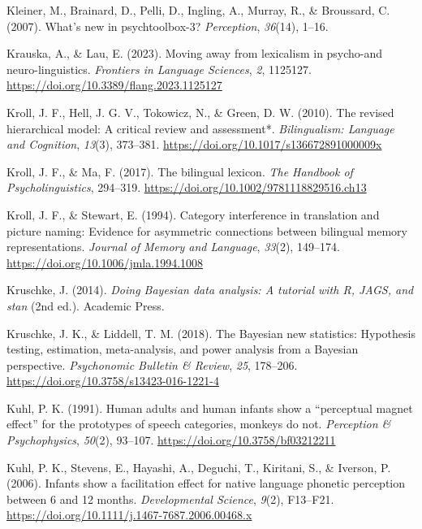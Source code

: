 \documentclass[
  12pt,
  b5paperpaper,
  twoside]{scrreprt}
\newlength{\cslhangindent}
\newlength{\cslentryspacingunit} %
\newenvironment{CSLReferences}[2] %
 {%
  \setlength{\parindent}{0pt}
  \ifodd #1
  \let\oldpar\par
  \def\par{\hangindent=\cslhangindent\oldpar}
  \fi
  \setlength{\parskip}{#2\cslentryspacingunit}
 }%
 {}
\begin{document}
\begin{CSLReferences}{1}{0}
\leavevmode{}%
Kleiner, M., Brainard, D., Pelli, D., Ingling, A., Murray, R., \&
Broussard, C. (2007). What's new in psychtoolbox-3? \emph{Perception},
\emph{36}(14), 1--16.

\leavevmode{}%
Krauska, A., \& Lau, E. (2023). Moving away from lexicalism in
psycho-and neuro-linguistics. \emph{Frontiers in Language Sciences},
\emph{2}, 1125127. \url{https://doi.org/10.3389/flang.2023.1125127}

\leavevmode{}%
Kroll, J. F., Hell, J. G. V., Tokowicz, N., \& Green, D. W. (2010). The
revised hierarchical model: A critical review and assessment*.
\emph{Bilingualism: Language and Cognition}, \emph{13}(3), 373--381.
\url{https://doi.org/10.1017/s136672891000009x}

\leavevmode{}%
Kroll, J. F., \& Ma, F. (2017). The bilingual lexicon. \emph{The
Handbook of Psycholinguistics}, 294--319.
\url{https://doi.org/10.1002/9781118829516.ch13}

\leavevmode{}%
Kroll, J. F., \& Stewart, E. (1994). Category interference in
translation and picture naming: Evidence for asymmetric connections
between bilingual memory representations. \emph{Journal of Memory and
Language}, \emph{33}(2), 149--174.
\url{https://doi.org/10.1006/jmla.1994.1008}

\leavevmode{}%
Kruschke, J. (2014). \emph{Doing {Bayesian} data analysis: A tutorial
with {R}, {JAGS}, and stan} (2nd ed.). {Academic Press}.

\leavevmode{}%
Kruschke, J. K., \& Liddell, T. M. (2018). The {Bayesian} new
statistics: Hypothesis testing, estimation, meta-analysis, and power
analysis from a {Bayesian} perspective. \emph{Psychonomic Bulletin \&
Review}, \emph{25}, 178--206.
\url{https://doi.org/10.3758/s13423-016-1221-4}

\leavevmode{}%
Kuhl, P. K. (1991). Human adults and human infants show a {``perceptual
magnet effect''} for the prototypes of speech categories, monkeys do
not. \emph{Perception \& Psychophysics}, \emph{50}(2), 93--107.
\url{https://doi.org/10.3758/bf03212211}

\leavevmode{}%
Kuhl, P. K., Stevens, E., Hayashi, A., Deguchi, T., Kiritani, S., \&
Iverson, P. (2006). Infants show a facilitation effect for native
language phonetic perception between 6 and 12 months.
\emph{Developmental Science}, \emph{9}(2), F13--F21.
\url{https://doi.org/10.1111/j.1467-7687.2006.00468.x}


\end{CSLReferences}
\end{document}
